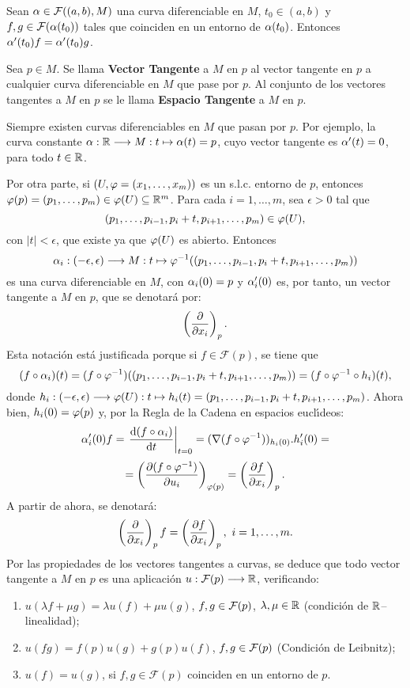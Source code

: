 \documentclass[cursovd_portada.tex]{subfiles}
\begin{document}
\begin{prop}
Sean $\alpha\in{\cal F}((a,b),M)$ una curva diferenciable en $M$, $t_0\in (a,b)$ y $f,g\in\mathcal{F}(\alpha(t_0))$ tales
que coinciden en un entorno de $\alpha(t_0)$. Entonces $\alpha'(t_0)f=\alpha'(t_0)g$.
\end{prop}
\begin{defi}
Sea $p\in M$. Se llama {\bf Vector Tangente} a $M$ en $p$ al vector tangente en $p$ a cualquier curva
diferenciable en $M$ que pase por $p$. Al conjunto de los vectores tangentes a $M$ en $p$ se le llama {\bf Espacio
Tangente} a $M$ en $p$.
\end{defi}
Siempre existen curvas diferenciables en $M$ que pasan por $p$. Por ejemplo, la curva constante $\alpha:\mathbb{R}\longrightarrow
M:t\mapsto\alpha(t)=p$, cuyo vector tangente es $\alpha'(t)=0$, para todo $t\in\mathbb{R}$.
\par
Por otra parte, si $(U,\varphi=(x_1,\dots ,x_m))$ es un s.l.c. entorno de $p$, entonces $\varphi(p)=(p_1,\dots
,p_m)\in\varphi(U)\subseteq\mathbb{R}^m$. Para cada $i=1,\dots ,m$, sea $\epsilon>0$ tal que
$$(p_1,\dots ,p_{i-1},p_i+t,p_{i+1},\dots ,p_m)\in\varphi(U),$$
con $\vert t\vert <\epsilon$, que existe ya que $\varphi(U)$ es abierto. Entonces
$$\alpha_i:(-\epsilon,\epsilon)\longrightarrow M:t\mapsto\varphi^{-1}((p_1,\dots ,p_{i-1},p_i+t,p_{i+1},\dots ,p_m))$$
es una curva diferenciable en $M$, con $\alpha_i(0)=p$ y $\alpha_i'(0)$ es, por tanto, un vector tangente a $M$ en $p$,
que se denotar\'{a} por:
$$\left(\displaystyle{\frac{\partial}{\partial x_i}}\right)_p.$$
\hs Esta notaci\'{o}n est\'{a} justificada porque si $f\in\mathcal{F}(p)$, se tiene que
$$(f\circ\alpha_i)(t)=(f\circ\varphi^{-1})((p_1,\dots ,p_{i-1},p_i+t,p_{i+1},\dots ,p_m))=(f\circ\varphi^{-1}\circ h_i)(t),$$
donde $h_i:(-\epsilon,\epsilon)\longrightarrow\varphi(U):t\mapsto h_i(t)=(p_1,\dots ,p_{i-1},p_i+t,p_{i+1},\dots ,p_m)$. Ahora
bien, $h_i(0)=\varphi(p)$ y, por la Regla de la Cadena en espacios eucl\'{\i}deos:
$$\alpha_i'(0)f=\left.\displaystyle{\frac{{\rm d} (f\circ\alpha_i)}{{\rm d} t}}\right|_{t=0}=(\nabla(f\circ\varphi^{-1}))_{h_i(0)}.h'_i(0)=$$
$$=\left(\displaystyle{\frac{\partial (f\circ\varphi^{-1})}{\partial u_i}}\right)_{\varphi(p)}= \left(\displaystyle{\frac{\partial f}{\partial x_i}}\right)_p.$$
\hs A partir de ahora, se denotar\'{a}:
$$\left(\displaystyle{\frac{\partial}{\partial x_i}}\right)_pf=\left(\displaystyle{\frac{\partial f}{\partial x_i}}\right)_p,\mbox{ }i=1,\dots ,m.$$
\hs Por las propiedades de los vectores tangentes a curvas, se deduce que todo vector tangente a $M$ en $p$ es una
aplicaci\'{o}n $u:\mathcal{F}(p)\longrightarrow\mathbb{R}$, verificando:
\begin{enumerate}
\item $u(\lambda f+\mu g)=\lambda u(f)+\mu u(g)$, $f,g\in{\cal F}(p)$, $\lambda,\mu\in\mathbb{R}$ (condici\'{o}n de
$\mathbb{R}$--linealidad);
\item $u(fg)=f(p)u(g)+g(p)u(f)$, $f,g\in{\cal F}(p)$ (Condici\'{o}n de Leibnitz);
\item $u(f)=u(g)$, si $f,g\in\mathcal{F}(p)$ coinciden en un entorno de $p$.
\end{enumerate}
\end{document}
